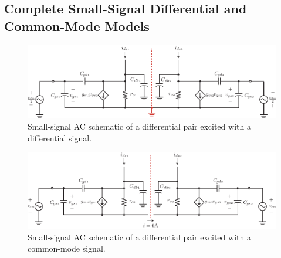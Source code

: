 \subsection{Complete Small-Signal Differential and Common-Mode Models}
\begin{figure}[tb]
\begin{center}
\includegraphics[width=\columnwidth]{DM_symmetry_small_signal.pdf}
\end{center}
\caption{Small-signal AC schematic of a differential pair excited with a differential signal.} \label{fig:DM_symmetry_small_signal.pdf}
\end{figure}
\begin{figure}[tb]
\begin{center}
\includegraphics[width=\columnwidth]{CM_symmetry_small_signal.pdf}
\end{center}
\caption{Small-signal AC schematic of a differential pair excited with a common-mode signal.} \label{fig:CM_symmetry_small_signal.pdf}
\end{figure}

